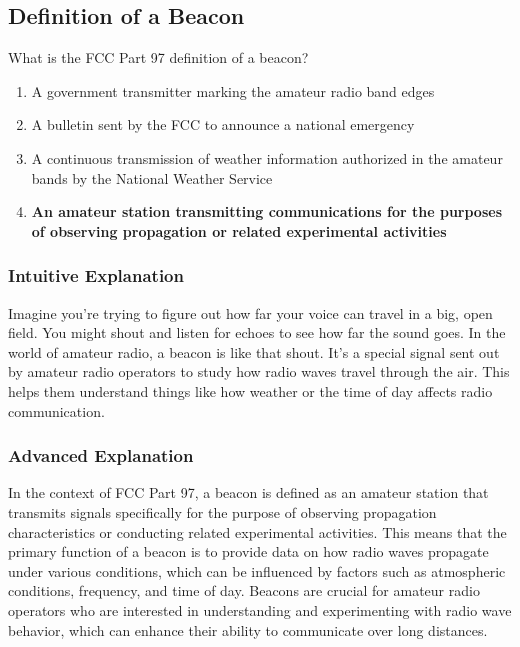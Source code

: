 \subsection{Definition of a Beacon} \label{T1A06}

\begin{tcolorbox}[colback=gray!10!white,colframe=black!75!black,title=T1A06]
What is the FCC Part 97 definition of a beacon?
\begin{enumerate}[label=\Alph*),noitemsep]
    \item A government transmitter marking the amateur radio band edges
    \item A bulletin sent by the FCC to announce a national emergency
    \item A continuous transmission of weather information authorized in the amateur bands by the National Weather Service
    \item \textbf{An amateur station transmitting communications for the purposes of observing propagation or related experimental activities}
\end{enumerate}
\end{tcolorbox}

\subsubsection{Intuitive Explanation}
Imagine you're trying to figure out how far your voice can travel in a big, open field. You might shout and listen for echoes to see how far the sound goes. In the world of amateur radio, a beacon is like that shout. It's a special signal sent out by amateur radio operators to study how radio waves travel through the air. This helps them understand things like how weather or the time of day affects radio communication.

\subsubsection{Advanced Explanation}
In the context of FCC Part 97, a beacon is defined as an amateur station that transmits signals specifically for the purpose of observing propagation characteristics or conducting related experimental activities. This means that the primary function of a beacon is to provide data on how radio waves propagate under various conditions, which can be influenced by factors such as atmospheric conditions, frequency, and time of day. Beacons are crucial for amateur radio operators who are interested in understanding and experimenting with radio wave behavior, which can enhance their ability to communicate over long distances.